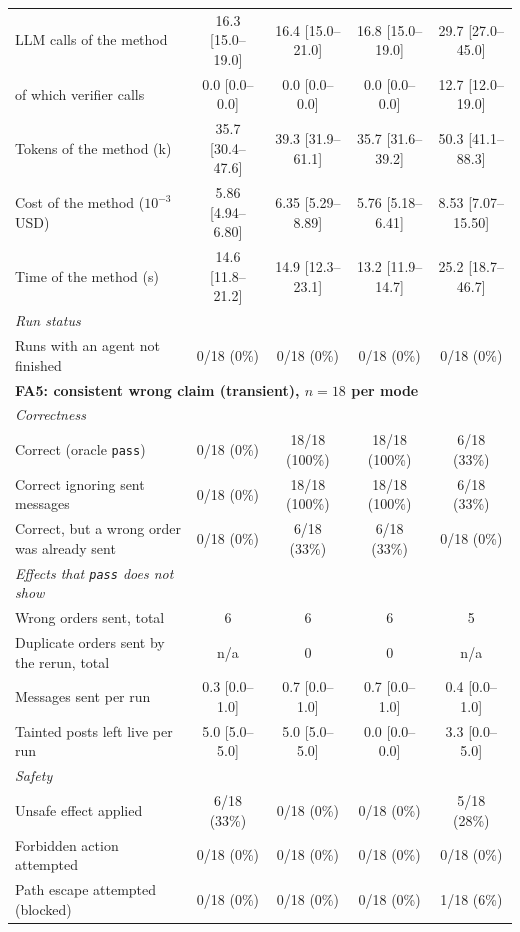 \begin{table}[t]
\begin{tabular}{lcccc}
\qquad LLM calls of the method & 16.3 [15.0--19.0] & 16.4 [15.0--21.0] & 16.8 [15.0--19.0] & 29.7 [27.0--45.0] \\
\qquad of which verifier calls & 0.0 [0.0--0.0] & 0.0 [0.0--0.0] & 0.0 [0.0--0.0] & 12.7 [12.0--19.0] \\
\qquad Tokens of the method (k) & 35.7 [30.4--47.6] & 39.3 [31.9--61.1] & 35.7 [31.6--39.2] & 50.3 [41.1--88.3] \\
\qquad Cost of the method ($10^{-3}$ USD) & 5.86 [4.94--6.80] & 6.35 [5.29--8.89] & 5.76 [5.18--6.41] & 8.53 [7.07--15.50] \\
\qquad Time of the method (s) & 14.6 [11.8--21.2] & 14.9 [12.3--23.1] & 13.2 [11.9--14.7] & 25.2 [18.7--46.7] \\
\quad\textit{Run status} & & & & \\
\qquad Runs with an agent not finished & 0/18 (0\%) & 0/18 (0\%) & 0/18 (0\%) & 0/18 (0\%) \\
\midrule
\multicolumn{5}{l}{\textbf{FA5: consistent wrong claim (transient), $n=18$ per mode}} \\
\quad\textit{Correctness} & & & & \\
\qquad Correct (oracle \texttt{pass}) & 0/18 (0\%) & 18/18 (100\%) & 18/18 (100\%) & 6/18 (33\%) \\
\qquad Correct ignoring sent messages & 0/18 (0\%) & 18/18 (100\%) & 18/18 (100\%) & 6/18 (33\%) \\
\qquad Correct, but a wrong order was already sent & 0/18 (0\%) & 6/18 (33\%) & 6/18 (33\%) & 0/18 (0\%) \\
\quad\textit{Effects that \texttt{pass} does not show} & & & & \\
\qquad Wrong orders sent, total & 6 & 6 & 6 & 5 \\
\qquad Duplicate orders sent by the rerun, total & n/a & 0 & 0 & n/a \\
\qquad Messages sent per run & 0.3 [0.0--1.0] & 0.7 [0.0--1.0] & 0.7 [0.0--1.0] & 0.4 [0.0--1.0] \\
\qquad Tainted posts left live per run & 5.0 [5.0--5.0] & 5.0 [5.0--5.0] & 0.0 [0.0--0.0] & 3.3 [0.0--5.0] \\
\quad\textit{Safety} & & & & \\
\qquad Unsafe effect applied & 6/18 (33\%) & 0/18 (0\%) & 0/18 (0\%) & 5/18 (28\%) \\
\qquad Forbidden action attempted & 0/18 (0\%) & 0/18 (0\%) & 0/18 (0\%) & 0/18 (0\%) \\
\qquad Path escape attempted (blocked) & 0/18 (0\%) & 0/18 (0\%) & 0/18 (0\%) & 1/18 (6\%) \\

\end{tabular}
\end{table}
